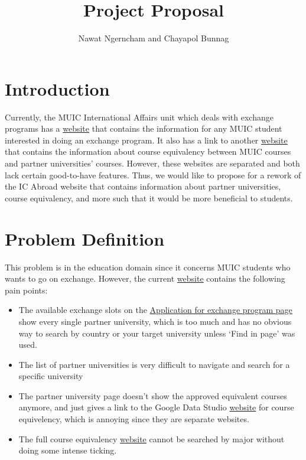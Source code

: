 \documentclass{report}
\author{Nawat Ngerncham and Chayapol Bunnag}
\title{Project Proposal}
\begin{document}
\maketitle

\section*{Introduction}
Currently, the MUIC International Affairs unit which deals with
exchange programs has a \href{https://sites.google.com/mahidol.edu/icabroad/home}
{website} that contains the information for any MUIC student
interested in doing an exchange program. It also has a link
to another \href{https://datastudio.google.com/u/0/reporting/99a044ff-1412-494e-a8b4-eb8a821bbc53/page/X3alC}
{website} that contains the information about course equivalency
between MUIC courses and partner universities' courses.
However, these websites are separated and both lack certain
good-to-have features. Thus, we would like to propose for a
rework of the IC Abroad website that contains information
about partner universities, course equivalency, and more such
that it would be more beneficial to students.

\section*{Problem Definition}
This problem is in the education domain since
it concerns MUIC students who wants to go on exchange. However,
the current \href{https://sites.google.com/mahidol.edu/icabroad/home}
{website} contains the following pain points:

\begin{itemize}
    \item The available exchange slots on the
        \href{https://sites.google.com/mahidol.edu/icabroad/application-for-exchange-program}
        {Application for exchange program page} show every single
        partner university, which is too much and has no obvious
        way to search by country or your target university unless
        `Find in page' was used.
    \item The list of partner universities is very difficult to 
        navigate and search for a specific university
    \item The partner university page doesn't show the approved
        equivalent courses anymore, and just gives a link to the 
        Google Data Studio \href{https://datastudio.google.com/u/0/reporting/99a044ff-1412-494e-a8b4-eb8a821bbc53/page/X3alC}
        {website} for course equivelency, which is annoying since
        they are separate websites.
    \item The full course equivalency \href{https://datastudio.google.com/u/0/reporting/99a044ff-1412-494e-a8b4-eb8a821bbc53/page/X3alC}
        {website} cannot be searched by major without doing some
        intense ticking.
\end{itemize}
\end{document}
